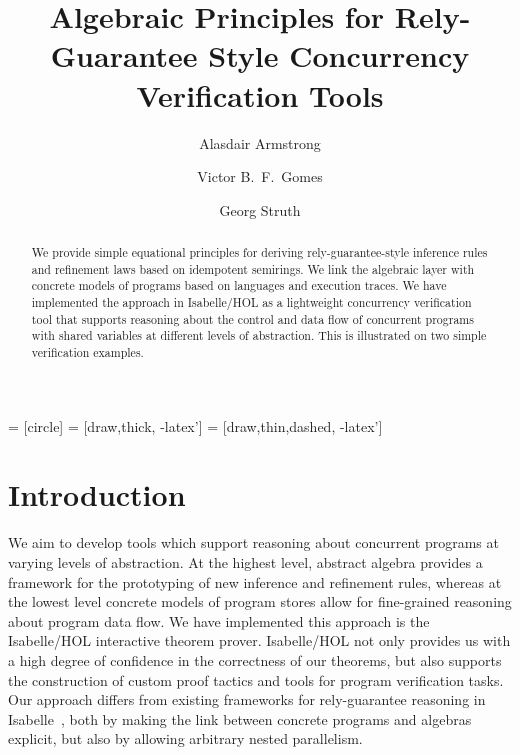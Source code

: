 \documentclass{llncs}
\begin{document}
 = [circle]
 = [draw,thick, -latex']
 = [draw,thin,dashed, -latex']

\title{Algebraic Principles for Rely-Guarantee Style Concurrency Verification Tools}

\author{Alasdair Armstrong \and Victor B.~F.~Gomes \and Georg Struth}


\maketitle

\begin{abstract}
  We provide simple equational principles for deriving
  rely-guarantee-style inference rules and refinement laws based on
  idempotent semirings. We link the algebraic layer with concrete
  models of programs based on languages and execution traces. We have
  implemented the approach in Isabelle/HOL as a lightweight
  concurrency verification tool that supports reasoning about the
  control and data flow of concurrent programs with shared variables
  at different levels of abstraction. This is illustrated on two
  simple verification examples.
\end{abstract}

\pagestyle{plain}

\section{Introduction}

We aim to develop tools which support reasoning about concurrent
programs at varying levels of abstraction. At the highest level,
abstract algebra provides a framework for the prototyping of new
inference and refinement rules, whereas at the lowest level concrete
models of program stores allow for fine-grained reasoning about
program data flow. We have implemented this approach is the
Isabelle/HOL interactive theorem prover. Isabelle/HOL not only
provides us with a high degree of confidence in the correctness of our
theorems, but also supports the construction of custom proof tactics
and tools for program verification tasks. Our approach differs from
existing frameworks for rely-guarantee reasoning in
Isabelle~\cite{nieto}, both by making the link between concrete
programs and algebras explicit, but also by allowing arbitrary nested
parallelism.
\end{document}
